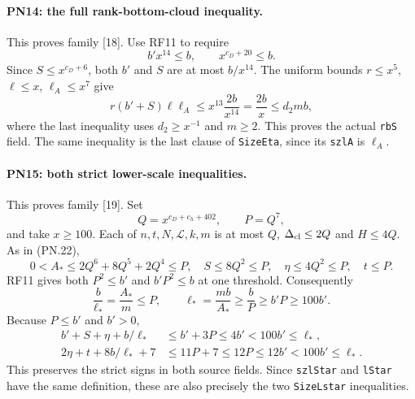 \documentclass[11pt,a4paper]{article}
\numberwithin{equation}{section}
\theoremstyle{remark}\newtheorem{remark}[theorem]{Remark}
\begin{document}
\paragraph{PN14: the full rank-bottom-cloud inequality.}
This proves family [18]. Use RF11 to require
\[
              b'x^{14}\leq b,
              \qquad x^{c_D+20}\leq b.
\]
Since $S\leq x^{c_D+6}$, both $b'$ and $S$ are at most $b/x^{14}$.
The uniform bounds $r\leq x^5$, $\ell\leq x$, $\ell_A\leq x^7$
give
\[
 r(b'+S)\ell\ell_A
       \leq x^{13}\frac{2b}{x^{14}}
       =\frac{2b}{x}\leq d_2mb,                           \tag{PN.35}
\]
where the last inequality uses $d_2\geq x^{-1}$ and $m\geq2$.
This proves the actual \texttt{rbS} field. The same inequality is the
last clause of \texttt{SizeEta}, since its \texttt{szlA} is $\ell_A$.

\paragraph{PN15: both strict lower-scale inequalities.}
This proves family [19]. Set
\[
 Q=x^{c_D+c_h+402},\qquad P=Q^7,
\]
and take $x\geq100$. Each of $n,t,N,\mathcal L,k,m$ is at most $Q$,
$\Delta_{\rm cl}\leq2Q$ and $H\leq4Q$. As in (PN.22),
\[
 0<A_*\leq2Q^6+8Q^5+2Q^4\leq P,\quad
 S\leq8Q^2\leq P,\quad\eta\leq4Q^2\leq P,\quad t\leq P.
\]
RF11 gives both $P^2\leq b'$ and $b'P^2\leq b$ at one threshold.
Consequently
\[
 \frac b{\ell_*}=\frac{A_*}{m}\leq P,
 \qquad \ell_*=\frac{mb}{A_*}\geq\frac bP
                  \geq b'P\geq100b'.                      \tag{PN.36}
\]
Because $P\leq b'$ and $b'>0$,
\begin{align*}
 b'+S+\eta+b/\ell_*&\leq b'+3P\leq4b'<100b'\leq\ell_*,\\
 2\eta+t+8b/\ell_*+7&\leq11P+7\leq12P
                                      \leq12b'<100b'\leq\ell_*.
                                                               \tag{PN.37}
\end{align*}
This preserves the strict signs in both source fields.
Since \texttt{szlStar} and \texttt{lStar} have the same definition,
these are also precisely the two \texttt{SizeLstar} inequalities.
\end{document}
